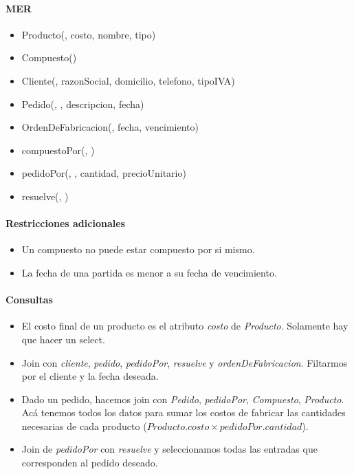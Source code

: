 \newpage
\begin{multicols}{2}
	\paragraph{MER}
	\begin{itemize}
		\item[] Producto(, costo, nombre, tipo)
		\item[] Compuesto()
		\item[] Cliente(, razonSocial, domicilio, telefono, tipoIVA)
		\item[] Pedido(, , descripcion, fecha)
		\item[] OrdenDeFabricacion(, fecha, vencimiento)
		\item[] compuestoPor(, )
		\item[] pedidoPor(, , cantidad, precioUnitario)
		\item[] resuelve(, )
	\end{itemize}
	\columnbreak
	\paragraph{Restricciones adicionales}
	\begin{itemize}
		\item Un compuesto no puede estar compuesto por si mismo.
		\item La fecha de una partida es menor a su fecha de vencimiento.
	\end{itemize}
	\paragraph{Consultas}
	\begin{itemize}
		\item El costo final de un producto es el atributo \textit{costo} de \textit{Producto}. Solamente hay que hacer un select.
		\item Join con \textit{cliente}, \textit{pedido}, \textit{pedidoPor}, \textit{resuelve} y \textit{ordenDeFabricacion}. Filtarmos por el cliente y la fecha deseada.
		\item Dado un pedido, hacemos join con \textit{Pedido}, \textit{pedidoPor}, \textit{Compuesto}, \textit{Producto}. Acá tenemos todos los datos para sumar los costos de fabricar las cantidades necesarias de cada producto ($Producto.costo\times pedidoPor.cantidad$).
		\item Join de \textit{pedidoPor} con \textit{resuelve} y seleccionamos todas las entradas que corresponden al pedido deseado.
	\end{itemize}
\end{multicols}
